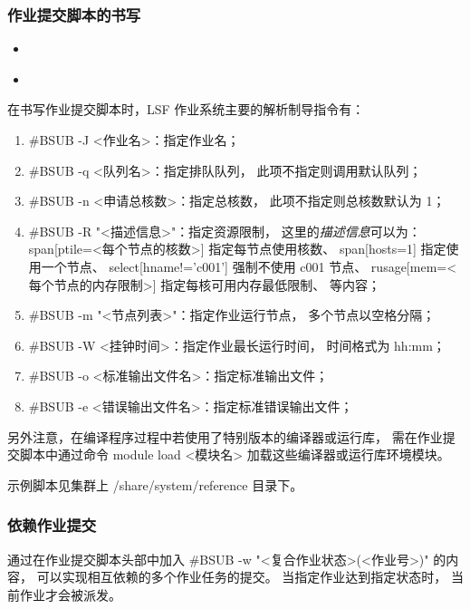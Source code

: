 \documentclass[UTF8]{ctexart}
\newcommand{\mynnote}[1]{\colorbox{gray!15}{\color{blue!65}#1}}
\newcommand{\insertbash}[2]{\begin{itemize}\item[]\end{itemize}}
\begin{document}
\subsubsection{作业提交脚本的书写}
\insertbash{material/mpi.lsf}{MPI 并行作业提交脚本示例}
\insertbash{material/openmp.lsf}{OpenMP 并行作业提交脚本示例}

在书写作业提交脚本时，LSF 作业系统主要的解析制导指令有：
\begin{enumerate}[\hspace{15mm}（1）]
  \item \mynnote{\#BSUB -J <作业名>}：指定作业名；
  \item \mynnote{\#BSUB -q <队列名>}：指定排队队列，
    此项不指定则调用默认队列；
  \item \mynnote{\#BSUB -n <申请总核数>}：指定总核数，
    此项不指定则总核数默认为 1；
  \item \mynnote{\#BSUB -R "<描述信息>"}：指定资源限制，
    这里的{\em 描述信息}可以为：\newline
    \mynnote{span[ptile=<每个节点的核数>]} 指定每节点使用核数、\newline
    \mynnote{span[hosts=1]} 指定使用一个节点、\newline
    \mynnote{select[hname!='c001']} 强制不使用 c001 节点、\newline
    \mynnote{rusage[mem=<每个节点的内存限制>]} 指定每核可用内存最低限制、\newline
    等内容；
  \item \mynnote{\#BSUB -m "<节点列表>"}：指定作业运行节点，
    多个节点以空格分隔；
  \item \mynnote{\#BSUB -W <挂钟时间>}：指定作业最长运行时间，
    时间格式为 hh:mm；
  \item \mynnote{\#BSUB -o <标准输出文件名>}：指定标准输出文件；
  \item \mynnote{\#BSUB -e <错误输出文件名>}：指定标准错误输出文件；
\end{enumerate}

另外注意，在编译程序过程中若使用了特别版本的编译器或运行库，
需在作业提交脚本中通过命令 \mynnote{module load <模块名>}
加载这些编译器或运行库环境模块。

示例脚本见集群上 /share/system/reference 目录下。

\subsubsection{依赖作业提交}
通过在作业提交脚本头部中加入 \mynnote{\#BSUB -w "<复合作业状态>(<作业号>)"} 的内容，
可以实现相互依赖的多个作业任务的提交。
当指定作业达到指定状态时，
当前作业才会被派发。
\end{document}
